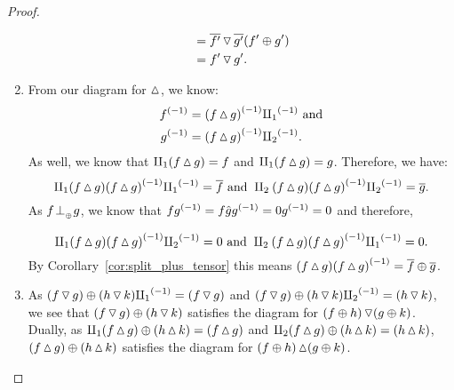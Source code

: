 \begin{proof}
\begin{enumerate}[{(}i{)}]
\begin{align*}
          & = \rst{f'} \tjleft \rst{g'}  (f'\+g') \\
          & = f'\tjleft g'.
      \end{align*}
    \item From our diagram for $\tjright$, we know:
      \begin{align*}
        \inv{f} &= \inv{(f\tjright g)} \icpa\text{ and}\\
        \inv{g} &= \inv{(f\tjright g)} \icpb.
      \end{align*}
      As well, we know that $\cpa(f\tjright g) = f$ and
      $\cpa(f\tjright g) = g$.
      Therefore, we have:
      \[
         \cpa(f\tjright g)\inv{(f\tjright g)} \icpa = \rst{f} \text{ and  }
          \cpb(f\tjright g)\inv{(f\tjright g)} \icpb = \rst{g}.
      \]
      As $f\tperp g$, we know that $f\inv{g} = f \rg{g} \inv{g} = 0 \inv{g} = 0$ and therefore,

      \[
         \cpa(f\tjright g)\inv{(f\tjright g)} \icpb = 0 \text{ and  }
          \cpb(f\tjright g)\inv{(f\tjright g)} \icpa = 0.
      \]
      By Corollary~\ref{cor:split_plus_tensor} this means
      $(f\tjright g)\inv{(f\tjright g)} = \rst{f} \+ \rst{g}$.
    \item As $(f\tjleft g)\+ (h\tjleft k)\icpa = (f\tjleft g)$ and
      $(f\tjleft g)\+ (h\tjleft k) \icpb = (h\tjleft k)$, we see that
      $(f\tjleft g)\+ (h\tjleft k)$ satisfies the diagram for $(f\+h)\tjleft(g\+k)$. Dually, as
      $\cpa (f\tjright g)\+ (h\tjright k) = (f\tjright g)$ and
      $\cpb(f\tjright g)\+ (h\tjright k) = (h\tjright k)$, $(f\tjright g)\+ (h\tjright k)$ satisfies
      the diagram for $(f\+h)\tjright(g\+k)$.
  \end{enumerate}
\end{proof}

